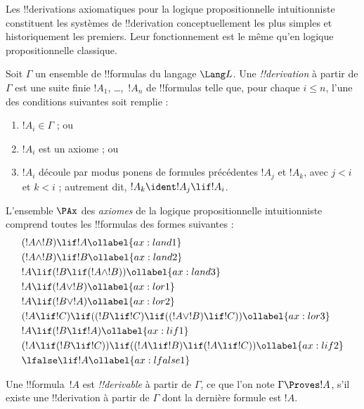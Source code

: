 \documentclass[../../../include/open-logic-section]{subfiles}
\begin{document}


Les !!{derivation}s axiomatiques pour la logique propositionnelle
intuitionniste constituent les systèmes de !!{derivation}
conceptuellement les plus simples et historiquement les premiers.
Leur fonctionnement est le même qu'en logique propositionnelle classique.

\begin{defn}[!!^{derivability}]
Soit $\Gamma$ un ensemble de !!{formula}s du langage $\Lang L$.
Une \emph{!!{derivation}} à partir de $\Gamma$ est une suite finie
$!A_1$, \dots,~$!A_n$ de !!{formula}s telle que, pour chaque
$i \le n$, l'une des conditions suivantes soit remplie :
\begin{enumerate}
\item $!A_i \in \Gamma$ ; ou
\item $!A_i$ est un axiome ; ou
\item $!A_i$ découle par modus ponens de formules précédentes
  $!A_j$ et $!A_k$, avec $j < i$ et $k < i$ ; autrement dit,
  $!A_k \ident !A_j \lif !A_i$.
\end{enumerate}
\end{defn}

\begin{defn}[Axiomes]
L'ensemble $\PAx$ des \emph{axiomes} de la logique propositionnelle
intuitionniste comprend toutes les !!{formula}s des formes suivantes :
\begin{align}
  & (!A \land !B) \lif !A \ollabel{ax:land1}\\
  & (!A \land !B) \lif !B \ollabel{ax:land2}\\
  & !A \lif (!B \lif (!A \land !B)) \ollabel{ax:land3}\\
  & !A \lif (!A \lor !B) \ollabel{ax:lor1}\\
  & !A \lif (!B \lor !A) \ollabel{ax:lor2}\\
  & (!A \lif !C) \lif ((!B \lif !C) \lif ((!A \lor !B) \lif !C)) \ollabel{ax:lor3}\\
  & !A \lif (!B \lif !A) \ollabel{ax:lif1}\\
  & (!A \lif (!B \lif !C)) \lif ((!A \lif !B) \lif (!A \lif !C)) \ollabel{ax:lif2}\\
  & \lfalse \lif !A \ollabel{ax:lfalse1}
\end{align}
\end{defn}

\begin{defn}[!!^{derivability}]
Une !!{formula}~$!A$ est \emph{!!{derivable}} à partir de
$\Gamma$, ce que l'on note $\Gamma \Proves !A$, s'il existe une
!!{derivation} à partir de $\Gamma$ dont la dernière formule est $!A$.
\end{defn}
\end{document}
